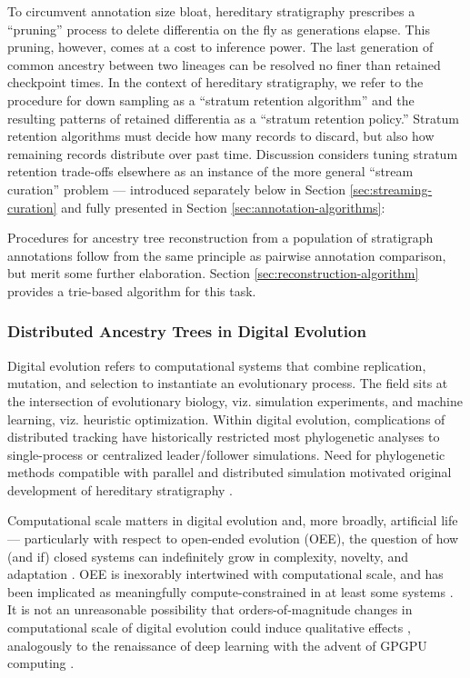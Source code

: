 To circumvent annotation size bloat, hereditary stratigraphy prescribes a ``pruning'' process to delete differentia on the fly as generations elapse.
This pruning, however, comes at a cost to inference power.
The last generation of common ancestry between two lineages can be resolved no finer than retained checkpoint times.
In the context of hereditary stratigraphy, we refer to the procedure for down sampling as a ``stratum retention algorithm'' and the resulting patterns of retained differentia as a ``stratum retention policy.''
Stratum retention algorithms must decide how many records to discard, but also how remaining records distribute over past time.
Discussion considers tuning stratum retention trade-offs elsewhere as an instance of the more general ``stream curation'' problem --- introduced separately below in Section \ref{sec:streaming-curation} and fully presented in Section \ref{sec:annotation-algorithms}:

Procedures for ancestry tree reconstruction from a population of stratigraph annotations follow from the same principle as pairwise annotation comparison, but merit some further elaboration.
Section \ref{sec:reconstruction-algorithm} provides a trie-based algorithm for this task.

\subsubsection{Distributed Ancestry Trees in Digital Evolution}

Digital evolution refers to computational systems that combine replication, mutation, and selection to instantiate an evolutionary process.
The field sits at the intersection of evolutionary biology, viz. simulation experiments, and machine learning, viz. heuristic optimization.
Within digital evolution, complications of distributed tracking have historically restricted most phylogenetic analyses to single-process or centralized leader/follower simulations.
Need for phylogenetic methods compatible with parallel and distributed simulation motivated original development of hereditary stratigraphy \citep{moreno2022hereditary}.

Computational scale matters in digital evolution and, more broadly, artificial life \citep{ackley2014indefinitely} --- particularly with respect to open-ended evolution (OEE), the question of how (and if) closed systems can indefinitely grow in complexity, novelty, and adaptation \citep{taylor2016open}.
OEE is inexorably intertwined with computational scale, and has been implicated as meaningfully compute-constrained in at least some systems \citep{channon2019maximum}.
It is not an unreasonable possibility that orders-of-magnitude changes in computational scale of digital evolution could induce qualitative effects \citep{moreno2022engineering}, analogously to the renaissance of deep learning with the advent of GPGPU computing \citep{krizhevsky2012imagenet}.

